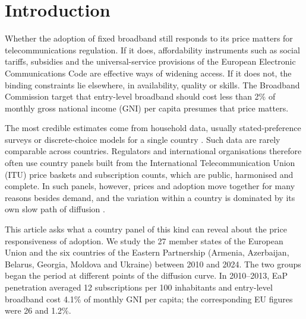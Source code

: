 \documentclass[pdflatex,sn-basic]{sn-jnl}
\begin{document}

\maketitle

\section{Introduction}\label{sec:intro}

Whether the adoption of fixed broadband still responds to its price matters for telecommunications regulation. If it does, affordability instruments such as social tariffs, subsidies and the universal-service provisions of the European Electronic Communications Code \citep{eecc2018} are effective ways of widening access. If it does not, the binding constraints lie elsewhere, in availability, quality or skills. The Broadband Commission target that entry-level broadband should cost less than 2\% of monthly gross national income (GNI) per capita \citep{broadbandcommission2018} presumes that price matters.

The most credible estimates come from household data, usually stated-preference surveys or discrete-choice models for a single country \citep{rosston2010household,cardona2009demand,ida2008discrete,grzybowski2014market,liu2018distinguishing}. Such data are rarely comparable across countries. Regulators and international organisations therefore often use country panels built from the International Telecommunication Union (ITU) price baskets and subscription counts, which are public, harmonised and complete. In such panels, however, prices and adoption move together for many reasons besides demand, and the variation within a country is dominated by its own slow path of diffusion \citep{griliches1957hybrid,geroski2000models,comin2010exploration}.

This article asks what a country panel of this kind can reveal about the price responsiveness of adoption. We study the 27 member states of the European Union and the six countries of the Eastern Partnership (Armenia, Azerbaijan, Belarus, Georgia, Moldova and Ukraine) between 2010 and 2024. The two groups began the period at different points of the diffusion curve. In 2010--2013, EaP penetration averaged 12 subscriptions per 100 inhabitants and entry-level broadband cost 4.1\% of monthly GNI per capita; the corresponding EU figures were 26 and 1.2\%.
\end{document}
